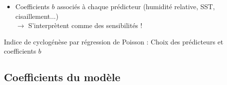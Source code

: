 \documentclass[aspectratio=169, usepdftitle=false, xcolor={dvipsnames}, 9pt,table]{beamer}
\begin{document}
\begin{frame}[c]
\begin{definition}
\begin{itemize}
            \item Coefficients $b$ associés à chaque prédicteur (humidité relative, SST, cisaillement...)\\
                $\longrightarrow$ S'interprètent comme des \alert{sensibilités} !
        \end{itemize} 
    \end{definition}
    \vspace{1em}
    \begin{center}
        \small
        Indice de cyclogénèse par régression de Poisson : Choix des \alert{prédicteurs} et \alert{coefficients} $b$
    \end{center}
\end{frame}

\subsection{Coefficients du modèle}
\end{document}
